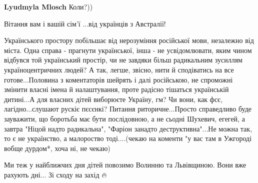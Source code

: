 \begin{itemize}
\begin{itemize}
 
\textbf{Lyudmyla Mlosch} Коли?))

\end{itemize}

 
Вітання вам і вашій сім'ї ...від українців з Австралії!

 

Українського простору побільшає від нерозуміння російської мови, незалежно від
міста. Одна справа - прагнути української, інша - не усвідомлювати, яким чином
відбувся той український простір, чи не завдяки більш радикальним зусиллям
україноцентричних людей? А так, легше, звісно, нити й сподіватись на все
готове...Половина з коментаторів шейрять і далі російською, не спроможні
змінити власні імена й налаштування, проте радісно тішаться українській
дитині...А для власних дітей виборюєте Україну, гм? Чи вони, как фсє,
лагідно...слушают рускіє пєсєнкі? Питання риторичне...Просто справедливо буде
зауважити, що боротьба має бути послідовною, а не сьодні Шухевич, егегей, а
завтра "Ніцой надто радикальна", "Фаріон занадто деструктивна"...Не можна так,
то є не українство, а малороство тоді....(чекаю на коменти "у вас там в
Ужгороді вобще дурдом*, хоча ні, не чекаю)

 
Ми теж у найближчих дня дітей повозимо Волинню та Львівщиною. Вони вже рахують дні... Зі сходу на захід 🔥

 

\end{itemize}
